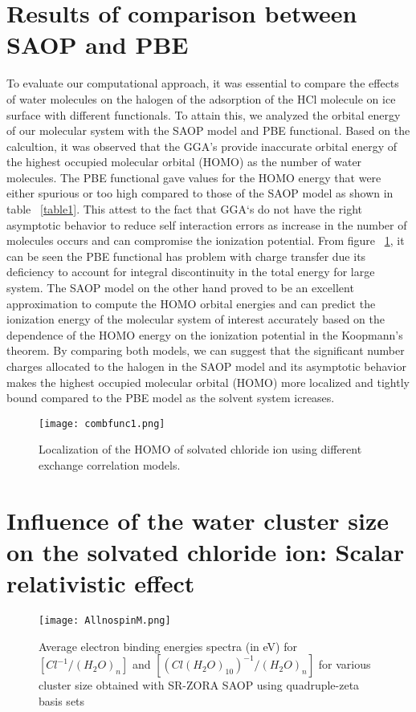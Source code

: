 \documentclass[a4paper,11pt]{report}
\begin{document}
\section{Results of comparison between SAOP and PBE}
To evaluate our computational approach, it was essential to compare the effects of water molecules on the halogen of the adsorption of  the HCl molecule on ice surface with different functionals. To attain this, we analyzed the orbital energy of our molecular system with the SAOP model and PBE functional. Based on the calcultion, it was observed that the GGA's provide inaccurate orbital energy of the highest occupied molecular orbital (HOMO) as the number of water molecules. The PBE functional gave values for the HOMO energy that were either spurious or too high compared to those of the SAOP model as shown in table ~\ref{table1}. This attest to the fact that GGA`s do not have the right asymptotic behavior to reduce self interaction errors as increase in the number of molecules occurs and can compromise the ionization potential. From figure ~\ref{figure0}, it can be seen the PBE functional has problem with charge transfer due its deficiency to account for integral discontinuity in the total energy for large system. The SAOP model on the other hand proved to be an excellent approximation to compute the HOMO orbital energies and can predict the ionization energy of the molecular system of interest accurately based on the dependence of the HOMO energy on the ionization potential in the Koopmann's theorem. By comparing both models, we can suggest that the significant number charges allocated to the halogen in the SAOP  model and its asymptotic behavior makes the highest occupied molecular orbital (HOMO) more localized and tightly bound compared to the PBE model as the solvent system icreases. 

\begin{figure}[H]\large
\texttt{[image: combfunc1.png]}
\caption{Localization of the HOMO of solvated chloride ion using different exchange correlation models.}
\label{figure0}
\end{figure}



\section{Influence of the water cluster size on the solvated chloride ion: Scalar relativistic effect}

\begin{figure}[H]\large
\captionsetup{font=footnotesize}
\texttt{[image: AllnospinM.png]}
\caption{Average electron binding energies spectra (in eV) for $[Cl^{-1}/(H_{2}O)_{n}]$ and $[(Cl(H_{2}O)_{10})^{-1}/(H_{2}O)_{n}]$ for various cluster size obtained with SR-ZORA SAOP using quadruple-zeta basis sets}
\label{figure47}
\end{figure}
\end{document}
